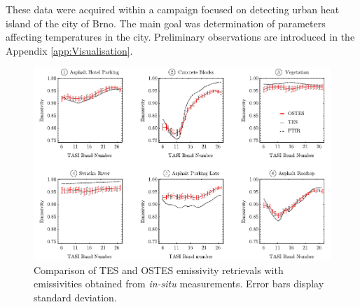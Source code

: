 These data were acquired within a campaign focused on detecting urban heat island of the city of Brno. The main goal was determination of parameters affecting temperatures in the city. Preliminary observations are introduced in the Appendix \ref{app:Visualisation}.

\begin{figure}[!t]
\centering
\includegraphics[width=\linewidth]{pics/Chapter_04/Brno-Emissivity-Comparison.pdf}
\vspace{1.5 em}
\caption{Comparison of TES and OSTES emissivity retrievals with emissivities obtained from \textit{in-situ} measurements. Error bars display standard deviation.}
\label{fig:BrnoEmissivityComparison}
\end{figure}


